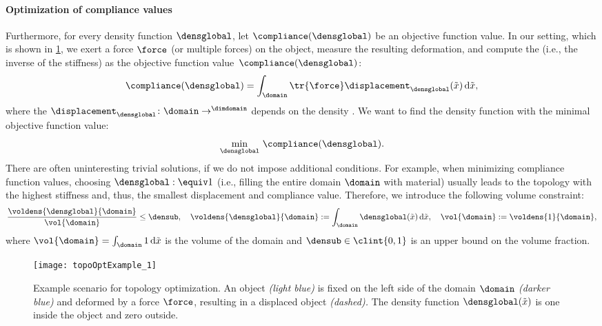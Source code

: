 \paragraph{Optimization of compliance values}

Furthermore, for every density function $\densglobal$,
let $\compliance(\densglobal)$ be an objective function value.
In our setting, which is shown in \cref{fig:topoOptExample},
we exert a force $\force$ (or multiple forces) on the object,
measure the resulting deformation, and
compute the  (i.e., the inverse of the stiffness) as
the objective function value~$\compliance(\densglobal)$:
\begin{equation}
  \compliance(\densglobal)
  = \int_{\domain} \tr{\force} \displacement_{\densglobal}(\tilde{\*x})
  \diff\tilde{\*x},
\end{equation}
where the 
$\displacement_{\densglobal}\colon \domain \to \real^{\dimdomain}$
depends on the density \cite{Huebner14Mehrdimensionale}.
We want to find the density function
with the minimal objective function value:
\begin{equation}
  \label{eq:topoOptProblemContinuous}
  \min_{\densglobal}\, \compliance(\densglobal).
\end{equation}
There are often uninteresting trivial solutions,
if we do not impose additional conditions.
For example, when minimizing compliance function values,
choosing $\densglobal :\equiv 1$
(i.e., filling the entire domain $\domain$ with material)
usually leads to the topology with the
highest stiffness and, thus, the smallest displacement and compliance value.
Therefore, we introduce the following volume constraint:
\begin{equation}
  \frac{\voldens{\densglobal}{\domain}}{\vol{\domain}} \le \densub,\quad
  \voldens{\densglobal}{\domain}
  := \int_{\domain} \densglobal(\tilde{\*x}) \diff\tilde{\*x},\quad
  \vol{\domain}
  := \voldens{1}{\domain},
\end{equation}
where $\vol{\domain} = \int_{\domain} 1 \diff\tilde{\*x}$
is the volume of the domain and
$\densub \in \clint{0, 1}$ is an upper bound on the volume fraction.

\begin{SCfigure}
  \texttt{[image: topoOptExample\_1]}%
  \caption[%
    Example scenario for topology optimization%
  ]{%
    Example scenario for topology optimization.
    An object \emph{\textcolor{hellblau}{(light blue)}}
    is fixed on the left side
    of the domain $\domain$
    \emph{\textcolor{mittelblau!50}{(darker blue)}}
    and deformed by a force $\force$, resulting in a displaced object
    \emph{(dashed).}
    The density function $\densglobal(\tilde{\*x})$ is one inside the object
    and zero outside.%
  }%
  \label{fig:topoOptExample}%
\end{SCfigure}



